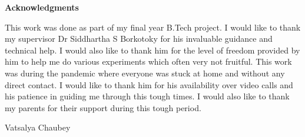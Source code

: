 \newpage


\thispagestyle{empty}
\begin{center}
	\textbf{\Large Acknowledgments}
\end{center}

This work was done as part of my final year B.Tech project. I would like to thank my supervisor Dr Siddhartha S Borkotoky for his invaluable guidance and technical help. I would also like to thank him for the level of freedom provided by him to help me do various experiments which often very not fruitful. This work was during the pandemic where everyone was stuck at home and without any direct contact. I would like to thank him for his availability over video calls and his patience in guiding me through this tough times. I would also like to thank my parents for their support during this tough period.


\vspace{3em}
\begin{flushright}
	Vatsalya Chaubey
\end{flushright}

